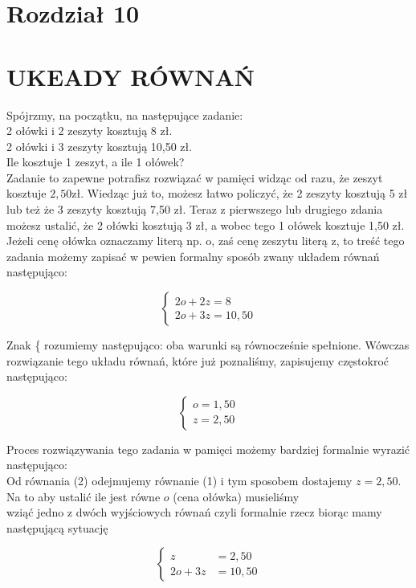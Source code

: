 \documentclass[10pt]{article}
\begin{document}
\section*{Rozdział 10}
\section*{UKEADY RÓWNAŃ}
Spójrzmy, na początku, na następujące zadanie:\\
2 ołówki i 2 zeszyty kosztują 8 zł.\\
2 ołówki i 3 zeszyty kosztują 10,50 zł.\\
Ile kosztuje 1 zeszyt, a ile 1 ołówek?\\
Zadanie to zapewne potrafisz rozwiązać w pamięci widząc od razu, że zeszyt kosztuje \(2,50 \mathrm{zł}\). Wiedząc już to, możesz łatwo policzyć, że 2 zeszyty kosztują 5 zł lub też że 3 zeszyty kosztują 7,50 zł. Teraz z pierwszego lub drugiego zdania możesz ustalić, że 2 ołówki kosztują 3 zł, a wobec tego 1 ołówek kosztuje 1,50 zł.\\
Jeżeli cenę ołówka oznaczamy literą np. o, zaś cenę zeszytu literą z, to treść tego zadania możemy zapisać w pewien formalny sposób zwany układem równań następująco:

\[
\left\{\begin{array}{l}
2 o+2 z=8 \\
2 o+3 z=10,50
\end{array}\right.
\]

Znak \{ rozumiemy następująco: oba warunki są równocześnie spełnione. Wówczas rozwiązanie tego układu równań, które już poznaliśmy, zapisujemy częstokroć następująco:

\[
\left\{\begin{array}{l}
o=1,50 \\
z=2,50
\end{array}\right.
\]

Proces rozwiązywania tego zadania w pamięci możemy bardziej formalnie wyrazić następująco:\\
Od równania (2) odejmujemy równanie (1) i tym sposobem dostajemy \(z=2,50\). Na to aby ustalić ile jest równe \(o\) (cena ołówka) musieliśmy\\
wziąć jedno z dwóch wyjściowych równań czyli formalnie rzecz biorąc mamy następującą sytuację

\[
\left\{\begin{aligned}
z & =2,50 \\
2 o+3 z & =10,50
\end{aligned}\right.
\]
\end{document}
